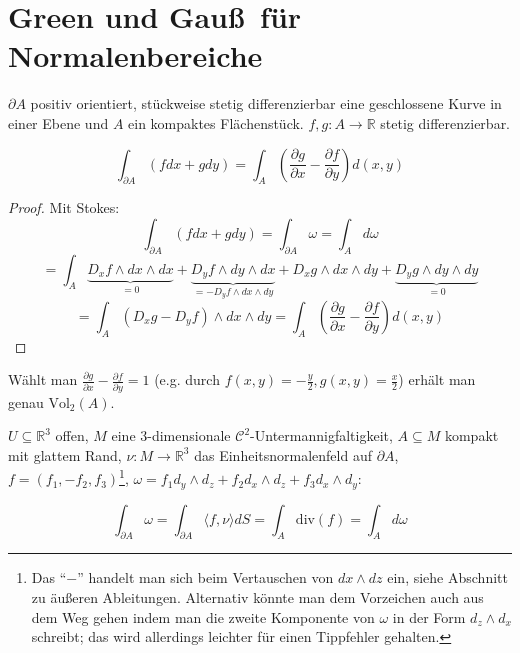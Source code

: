 \section{Green und Gau\ss \, f\"ur Normalenbereiche}
\begin{theorem}[Green]
	$\partial A$ positiv orientiert, st\"uckweise stetig differenzierbar eine geschlossene Kurve in einer Ebene und $A$ ein kompaktes Fl\"achenst\"uck. $f,g:A\rightarrow\mathbb R$ stetig differenzierbar.
	
	$$\int_{\partial A} (fdx+gdy) = \int_A \left(\frac{\partial g}{\partial x} - \frac{\partial f}{\partial y}\right)d(x,y)$$
\end{theorem}
\begin{proof}
	Mit Stokes:
	$$\int_{\partial A} (fdx+gdy) = \int_{\partial A}\omega = \int_A d\omega $$
	$$= \int_A \underbrace{D_x f\wedge dx\wedge dx}_{=0} + \underbrace{D_y f\wedge dy\wedge dx}_{=-D_y f\wedge dx\wedge dy}+D_x g\wedge dx\wedge dy + \underbrace{D_y g\wedge dy\wedge dy}_{=0}$$
	$$= \int_A (D_x g- D_yf)\wedge dx\wedge dy = \int_A \left(\frac{\partial g}{\partial x} - \frac{\partial f}{\partial y}\right)d(x,y)$$
\end{proof}

\begin{remark}[Spezialfall]
	W\"ahlt man $\frac{\partial g}{\partial x} - \frac{\partial f}{\partial y}=1$ (e.g. durch $f(x,y)=-\frac{y}{2}, g(x,y)=\frac{x}{2}$) erh\"alt man genau $\text{Vol}_2(A)$.
\end{remark}


\begin{theorem}[Gau\ss]
	$U\subseteq \mathbb R^3$ offen, $M$ eine $3$-dimensionale $\mathcal C^2$-Untermannigfaltigkeit, $A\subseteq M$ kompakt mit glattem Rand, $\nu:M\rightarrow\mathbb R^3$ das Einheitsnormalenfeld auf $\partial A$, $f=(f_1,-f_2,f_3)$\footnote{Das ``$-$'' handelt man sich beim Vertauschen von $dx\wedge dz$ ein, siehe Abschnitt zu \"au\ss eren Ableitungen. Alternativ k\"onnte man dem Vorzeichen auch aus dem Weg gehen indem man die zweite Komponente von $\omega$ in der Form $d_z\wedge d_x$ schreibt; das wird allerdings leichter f\"ur einen Tippfehler gehalten.}, $\omega = f_1 d_y\wedge d_z+f_2 d_x\wedge d_z+ f_3 d_x\wedge d_y$:
	
	$$\int_{\partial A}\omega = \boxed{\int_{\partial A}\langle f,\nu \rangle dS = \int_A \text{div}(f)} = \int_A d\omega$$
\end{theorem}












